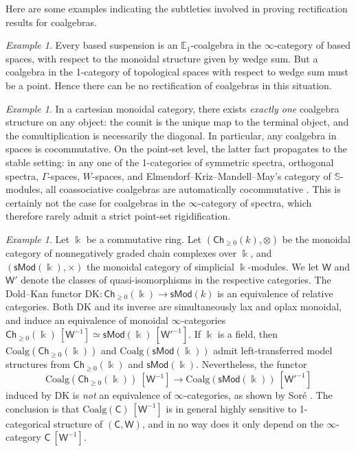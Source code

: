 \documentclass[a4paper,12pt]{amsart}
\theoremstyle{plain}
\theoremstyle{definition}
\theoremstyle{remark}
\newtheorem{example}[theorem]{\sc Example}%
\newcommand{\kk}{\Bbbk}
\begin{document}
Here are some examples indicating the subtleties involved in proving rectification results for coalgebras.

\begin{example}
    Every based suspension is an $\mathbb E_1$-coalgebra in the $\infty$-category of based spaces, with respect to the monoidal structure given by wedge sum. But a coalgebra in the 1-category of topological spaces with respect to wedge sum must be a point. Hence there can be no rectification of coalgebras in this situation.
\end{example}

\begin{example}In a cartesian monoidal category, there exists \emph{exactly one} coalgebra structure on any object: the counit is the unique map to the terminal object, and the comultiplication is necessarily the diagonal. In particular, any coalgebra in spaces is cocommutative. On the point-set level, the latter fact propagates to the stable setting: in any one of the 1-categories of symmetric spectra, orthogonal spectra, $\Gamma$-spaces, $W$-spaces, and Elmendorf--Kriz--Mandell--May's category of $\mathbb S$-modules, all coassociative coalgebras are automatically cocommutative \cite{ps}. This is certainly not the case for coalgebras in the $\infty$-category of spectra, which therefore rarely admit a strict point-set rigidification.
\end{example}


\begin{example}
	Let $\kk$ be a commutative ring. Let $(\mathsf{Ch}_{\geq 0}(k),\otimes)$ be the monoidal category of nonnegatively graded chain complexes over $\kk$, and $(\mathsf{sMod}(\kk),\times)$ the monoidal category of simplicial $\kk$-modules. We let $\mathsf W$ and $\mathsf W'$ denote the classes of quasi-isomorphisms in the respective categories. The Dold--Kan functor 
	$\mathrm{DK} : \mathsf{Ch}_{\geq 0}(\kk) \longrightarrow \mathsf{sMod}(k)$
	is an equivalence of relative categories. Both $\mathrm{DK}$ and its inverse are simultaneously lax and oplax monoidal, and induce an equivalence of monoidal $\infty$-categories $\mathsf{Ch}_{\geq 0}(\kk)~[\mathsf W^{-1}] \simeq \mathsf{sMod}(\kk)~[\mathsf W'^{-1}]$. If $\kk$ is a field, then $\mathrm{Coalg}(\mathsf{Ch}_{\geq 0}(\kk))$ and $\mathrm{Coalg}(\mathsf{sMod}(\kk))$ admit left-transferred model structures from $\mathsf{Ch}_{\geq 0}(\kk)$ and $\mathsf{sMod}(\kk)$. Nevertheless, the  functor 
	\[ \mathrm{Coalg}(\mathsf{Ch}_{\geq 0}(\kk))~[\mathsf W^{-1}] \longrightarrow \mathrm{Coalg}(\mathsf{sMod}(\kk))~[\mathsf W'^{-1}]\]
	induced by $\mathrm{DK}$ is \emph{not} an equivalence of $\infty$-categories, as shown by Sor\'e \cite{sore}. The conclusion is that $\mathrm{Coalg}(\mathsf C)~[\mathsf W^{-1}]$ is in general highly sensitive to 1-categorical structure of $(\mathsf C,\mathsf W)$, and in no way does it only depend on the $\infty$-category $\mathsf C~[\mathsf W^{-1}]$. 
\end{example}
\end{document}

